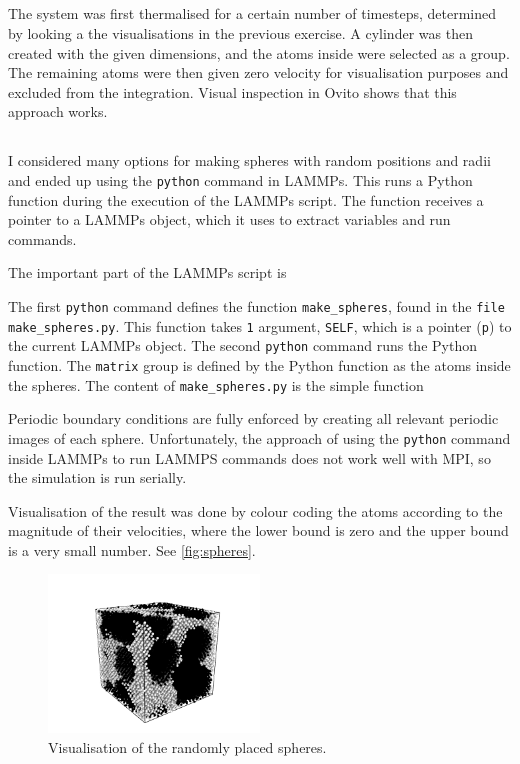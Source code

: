 \documentclass[11pt,british,a4paper]{report}
\begin{document}
\subsection{}
The system was first thermalised for a certain number of timesteps, determined by looking a the visualisations in the previous exercise. A cylinder was then created with the given dimensions, and the atoms inside were selected as a group. The remaining atoms were then given zero velocity for visualisation purposes and excluded from the integration. Visual inspection in Ovito shows that this approach works.

\subsection{}
I considered many options for making spheres with random positions and radii and ended up using the \texttt{python} command in LAMMPs. This runs a Python function during the execution of the LAMMPs script. The function receives a pointer to a LAMMPs object, which it uses to extract variables and run commands.

The important part of the LAMMPs script is

The first \texttt{python} command defines the function \texttt{make\_spheres}, found in the \texttt{file make\_spheres.py}. This function takes \texttt{1} argument, \texttt{SELF}, which is a pointer (\texttt{p}) to the current LAMMPs object. The second \texttt{python} command runs the Python function. The \texttt{matrix} group is defined by the Python function as the atoms inside the spheres. The content of \texttt{make\_spheres.py} is the simple function

Periodic boundary conditions are fully enforced by creating all relevant periodic images of each sphere. Unfortunately, the approach of using the \texttt{python} command inside LAMMPs to run LAMMPS commands does not work well with MPI, so the simulation is run serially.

Visualisation of the result was done by colour coding the atoms according to the magnitude of their velocities, where the lower bound is zero and the upper bound is a very small number. See \vref{fig:spheres}.
\begin{figure}[tbh]
    \centering
    \includegraphics[width=0.5\textwidth]{cd/spheres.png}
    \caption{Visualisation of the randomly placed spheres.}%
    \label{fig:spheres}
\end{figure}
\end{document}

